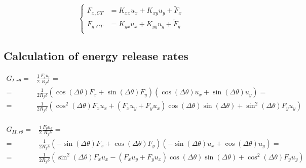 \documentclass[a4paper]{jpconf}
\begin{document}
\begin{equation}
\begin{cases}
F_{x,CT}&= K_{xx}u_{x}+K_{xy}u_{y}+\widetilde{F}_{x}\\
F_{y,CT}&= K_{yx}u_{x}+K_{yy}u_{y}+\widetilde{F}_{y}\\
\end{cases}
\end{equation}

\subsection{Calculation of energy release rates}

\begin{equation}
\begin{split}
G_{I,r\theta} = &\frac{1}{2}\frac{F_{r}u_{r}}{R_{f}\delta}=\\
= &\frac{1}{2R_{f}\delta}\left(\cos\left(\Delta\theta\right) F_{x}+\sin\left(\Delta\theta\right)F_{y}\right)\left(\cos\left(\Delta\theta\right) u_{x}+\sin\left(\Delta\theta\right) u_{y}\right)=\\
= &\frac{1}{2R_{f}\delta}\left(\cos^{2}\left(\Delta\theta\right) F_{x}u_{x}+\left(F_{x}u_{y}+F_{y}u_{x}\right)\cos\left(\Delta\theta\right)\sin\left(\Delta\theta\right)+\sin^{2}\left(\Delta\theta\right)F_{y}u_{y}\right)\\
\end{split}
\end{equation}

\begin{equation}
\begin{split}
G_{II,r\theta} = &\frac{1}{2}\frac{F_{\theta}u_{\theta}}{R_{f}\delta}=\\
= &\frac{1}{2R_{f}\delta}\left(-\sin\left(\Delta\theta\right) F_{x}+\cos\left(\Delta\theta\right)F_{y}\right)\left(-\sin\left(\Delta\theta\right) u_{x}+\cos\left(\Delta\theta\right) u_{y}\right)=\\
= &\frac{1}{2R_{f}\delta}\left(\sin^{2}\left(\Delta\theta\right) F_{x}u_{x}-\left(F_{x}u_{y}+F_{y}u_{x}\right)\cos\left(\Delta\theta\right)\sin\left(\Delta\theta\right)+\cos^{2}\left(\Delta\theta\right)F_{y}u_{y}\right)\\
\end{split}
\end{equation}
\end{document}
